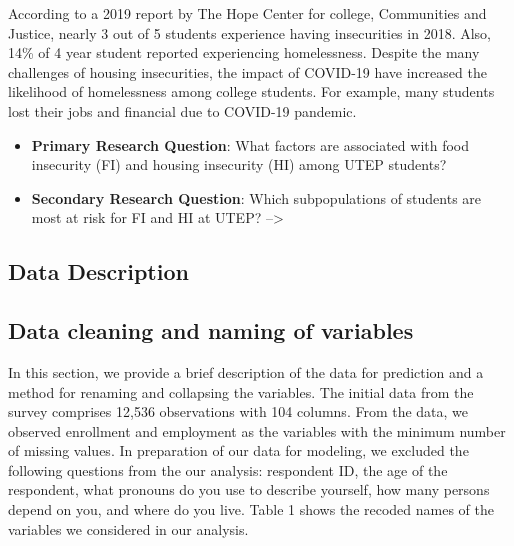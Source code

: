 \documentclass[
  10pt,
]{article}
\begin{document}
According to a 2019 report by The Hope Center for college, Communities and Justice, nearly 3 out of 5 students experience having insecurities in 2018. Also, 14\% of 4 year student reported experiencing homelessness. Despite the many challenges of housing insecurities, the impact of COVID-19 have increased the likelihood of homelessness among college students. For example, many students lost their jobs and financial due to COVID-19 pandemic.

\begin{itemize}
\item
  \textbf{Primary Research Question}: What factors are associated with food insecurity (FI) and housing insecurity (HI) among UTEP students?
\item
  \textbf{Secondary Research Question}: Which subpopulations of students are most at risk for FI and HI at UTEP? --\textgreater{}
\end{itemize}

\subsection{ Data Description}

\subsection{Data cleaning and naming of variables}

In this section, we provide a brief description of the data for prediction and a method for renaming and collapsing the variables. The initial data from the survey comprises 12,536 observations with 104 columns. From the data, we observed enrollment and employment as the variables with the minimum number of missing values. In preparation of our data for modeling, we excluded the following questions from the our analysis: respondent ID, the age of the respondent, what pronouns do you use to describe yourself, how many persons depend on you, and where do you live. Table 1 shows the recoded names of the variables we considered in our analysis.
\end{document}
